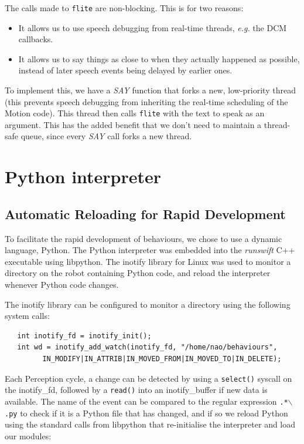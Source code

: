 \documentclass[pdftex,11pt,a4paper]{report}
\begin{document}
The calls made to \texttt{flite} are non-blocking. This is for two reasons:
\begin{itemize}
    \item It allows us to use speech debugging from real-time threads,
        \textit{e.g.} the DCM callbacks.
    \item It allows us to say things as close to when they actually
        happened as possible, instead of later speech events being delayed
        by earlier ones.
\end{itemize}
To implement this, we have a \emph{SAY} function that forks a new,
low-priority thread (this prevents speech debugging from inheriting the
real-time scheduling of the Motion code). This thread then calls
\texttt{flite} with the text to speak as an argument. This has the added
benefit that we don't need to maintain a thread-safe queue, since every
\emph{SAY} call forks a new thread.

\section{Python interpreter}
\subsection{Automatic Reloading for Rapid Development}
To facilitate the rapid development of behaviours, we chose to use a dynamic language, Python. The Python interpreter was embedded into the \emph{runswift} C++ executable using libpython. The inotify library for Linux was used to monitor a directory on the robot containing Python code, and reload the interpreter whenever Python code changes.

The inotify library can be configured to monitor a directory using the following system calls:

\begin{lstlisting}
   int inotify_fd = inotify_init();
   int wd = inotify_add_watch(inotify_fd, "/home/nao/behaviours",
         IN_MODIFY|IN_ATTRIB|IN_MOVED_FROM|IN_MOVED_TO|IN_DELETE);
\end{lstlisting}

Each Perception cycle, a change can be detected by using a \texttt{select()} syscall on the inotify\_fd, followed by a \texttt{read()} into an inotify\_buffer if new data is available. The name of the event can be compared to the regular expression \texttt{.*$\backslash$.py} to check if it is a Python file that has changed, and if so we reload Python using the standard calls from libpython that re-initialise the interpreter and load our modules:
\end{document}
